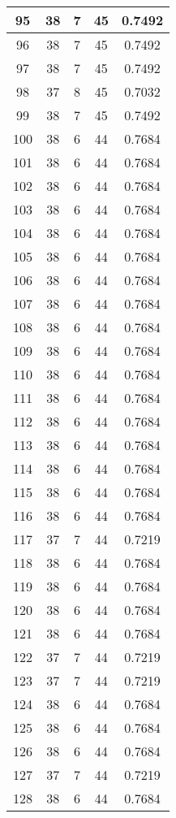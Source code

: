 \documentclass[letterpaper, 12pt]{article}
\begin{document}
\begin{longtable}{|c|c|c|c|c|}
95 & 38 & 7 & 45 & 0.7492 \\
\hline
96 & 38 & 7 & 45 & 0.7492 \\
\hline
97 & 38 & 7 & 45 & 0.7492 \\
\hline
98 & 37 & 8 & 45 & 0.7032 \\
\hline
99 & 38 & 7 & 45 & 0.7492 \\
\hline
100 & 38 & 6 & 44 & 0.7684 \\
\hline
101 & 38 & 6 & 44 & 0.7684 \\
\hline
102 & 38 & 6 & 44 & 0.7684 \\
\hline
103 & 38 & 6 & 44 & 0.7684 \\
\hline
104 & 38 & 6 & 44 & 0.7684 \\
\hline
105 & 38 & 6 & 44 & 0.7684 \\
\hline
106 & 38 & 6 & 44 & 0.7684 \\
\hline
107 & 38 & 6 & 44 & 0.7684 \\
\hline
108 & 38 & 6 & 44 & 0.7684 \\
\hline
109 & 38 & 6 & 44 & 0.7684 \\
\hline
110 & 38 & 6 & 44 & 0.7684 \\
\hline
111 & 38 & 6 & 44 & 0.7684 \\
\hline
112 & 38 & 6 & 44 & 0.7684 \\
\hline
113 & 38 & 6 & 44 & 0.7684 \\
\hline
114 & 38 & 6 & 44 & 0.7684 \\
\hline
115 & 38 & 6 & 44 & 0.7684 \\
\hline
116 & 38 & 6 & 44 & 0.7684 \\
\hline
117 & 37 & 7 & 44 & 0.7219 \\
\hline
118 & 38 & 6 & 44 & 0.7684 \\
\hline
119 & 38 & 6 & 44 & 0.7684 \\
\hline
120 & 38 & 6 & 44 & 0.7684 \\
\hline
121 & 38 & 6 & 44 & 0.7684 \\
\hline
122 & 37 & 7 & 44 & 0.7219 \\
\hline
123 & 37 & 7 & 44 & 0.7219 \\
\hline
124 & 38 & 6 & 44 & 0.7684 \\
\hline
125 & 38 & 6 & 44 & 0.7684 \\
\hline
126 & 38 & 6 & 44 & 0.7684 \\
\hline
127 & 37 & 7 & 44 & 0.7219 \\
\hline
128 & 38 & 6 & 44 & 0.7684 \\

\end{longtable}
\end{document}
